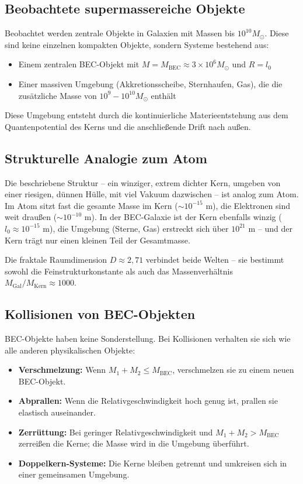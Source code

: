 \documentclass[12pt,a4paper]{article}
\begin{document}
\subsection{Beobachtete supermassereiche Objekte}

Beobachtet werden zentrale Objekte in Galaxien mit Massen bis $10^{10}M_{\odot}$. Diese sind keine einzelnen kompakten Objekte, sondern Systeme bestehend aus:
\begin{itemize}
\item Einem zentralen BEC-Objekt mit $M = M_{\text{BEC}} \approx 3 \times 10^6 M_{\odot}$ und $R = l_0$
\item Einer massiven Umgebung (Akkretionsscheibe, Sternhaufen, Gas), die die zusätzliche Masse von $10^9 - 10^{10} M_{\odot}$ enthält
\end{itemize}
Diese Umgebung entsteht durch die kontinuierliche Materieentstehung aus dem Quantenpotential des Kerns und die anschließende Drift nach außen.

\subsection{Strukturelle Analogie zum Atom}

Die beschriebene Struktur -- ein winziger, extrem dichter Kern, umgeben von einer riesigen, dünnen Hülle, mit viel Vakuum dazwischen -- ist analog zum Atom. Im Atom sitzt fast die gesamte Masse im Kern ($\sim 10^{-15}$ m), die Elektronen sind weit draußen ($\sim 10^{-10}$ m). In der BEC-Galaxie ist der Kern ebenfalls winzig ($l_0 \approx 10^{-15}$ m), die Umgebung (Sterne, Gas) erstreckt sich über $10^{21}$ m -- und der Kern trägt nur einen kleinen Teil der Gesamtmasse.

Die fraktale Raumdimension $D \approx 2,71$ verbindet beide Welten -- sie bestimmt sowohl die Feinstrukturkonstante als auch das Massenverhältnis $M_{\text{Gal}}/M_{\text{Kern}} \approx 1000$.

\subsection{Kollisionen von BEC-Objekten}

BEC-Objekte haben keine Sonderstellung. Bei Kollisionen verhalten sie sich wie alle anderen physikalischen Objekte:
\begin{itemize}
\item \textbf{Verschmelzung:} Wenn $M_1 + M_2 \le M_{\text{BEC}}$, verschmelzen sie zu einem neuen BEC-Objekt.
\item \textbf{Abprallen:} Wenn die Relativgeschwindigkeit hoch genug ist, prallen sie elastisch auseinander.
\item \textbf{Zerrüttung:} Bei geringer Relativgeschwindigkeit und $M_1 + M_2 > M_{\text{BEC}}$ zerreißen die Kerne; die Masse wird in die Umgebung überführt.
\item \textbf{Doppelkern-Systeme:} Die Kerne bleiben getrennt und umkreisen sich in einer gemeinsamen Umgebung.
\end{itemize}
\end{document}
